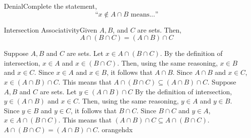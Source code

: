 

\begin{exercise}
    {Denial}Complete the statement, \[\text{``}x\notin A \cap B \text{ means...''}\]
\end{exercise}


\begin{exercise}
    {Intersection Associativity}Given \(A, B\), and \(C\) are sets. Then, \[A\cap (B\cap C) = (A \cap B) \cap C\]
\end{exercise}

\sbseteqpf
    {Suppose \(A,B\) and \(C\) are sets. Let \(x\in A\cap (B\cap C)\). By the definition of intersection, \(x\in A\) and \(x\in (B\cap C)\). Then, using the same reasoning, \(x\in B\) and \(x \in C\). Since \(x\in A\) and \(x\in B\), it follows that \(A\cap B\). Since \(A\cap B\) and \(x\in C\), \(x\in (A\cap B) \cap C\). This means that \(A\cap (B\cap C) \subseteq (A\cap B) \cap C\).}
    {Suppose \(A,B\) and \(C\) are sets. Let \(y\in (A\cap B)\cap C\) By the definition of intersection, \(y\in (A\cap B)\) and \(x\in C\). Then, using the same reasoning, \(y\in A\) and \(y\in B\). Since \(y\in B\) and \(y\in C\), it follows that \(B\cap C\). Since \(B\cap C\) and \(y\in A\), \(x\in A \cap (B \cap C)\). This means that \((A\cap B)\cap C \subseteq A\cap (B \cap C)\).}
    {\(A\cap (B\cap C) = (A\cap B) \cap C\).}
    {orangehdx}

\newpage


